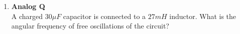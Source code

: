 \documentclass{article}
\begin{document}
\begin{enumerate}
    
     \item \textbf{Analog Q}\\
          A charged \(30 \mu F\) capacitor is connected to a \(27 mH\) inductor. What is the angular frequency of free oscillations of the circuit?

  \end{enumerate}
  
\end{document}
